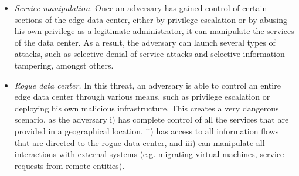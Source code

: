 \documentclass[twocolumn,preprint,3p]{elsarticle}
\begin{document}
\begin{itemize}
      \item \textit{Service manipulation.} Once an adversary has gained control of certain sections of the edge data center, either by privilege escalation or by abusing his own privilege as a legitimate administrator, it can manipulate the services of the data center. As a result, the adversary can launch several types of attacks, such as selective denial of service attacks and selective information tampering, amongst others.
      \item \textit{Rogue data center.} In this threat, an adversary is able to control an entire edge data center through various means, such as privilege escalation or deploying his own malicious infrastructure. This creates a very dangerous scenario, as the adversary i) has complete control of all the services that are provided in a geographical location, ii) has access to all information flows that are directed to the rogue data center, and iii) can manipulate all interactions with external systems (e.g. migrating virtual machines, service requests from remote entities).
    \end{itemize}
\end{document}
